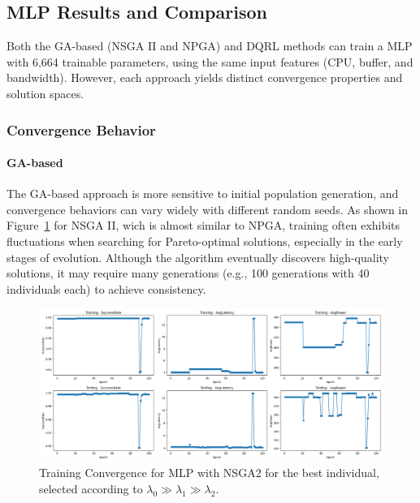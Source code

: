 \documentclass[preprint,12pt]{elsarticle}
\begin{document}
\subsection{MLP Results and Comparison}
\label{subsec:ga_vs_dqrl}

Both the GA-based (NSGA II and NPGA) and DQRL methods can train a MLP with 6,664 trainable parameters, using the same input features (CPU, buffer, and bandwidth). However, each approach yields distinct convergence properties and solution spaces.

\subsubsection{Convergence Behavior}
\paragraph{GA-based}
The GA-based approach is more sensitive to initial population generation, and convergence behaviors can vary widely with different random seeds. As shown in Figure~\ref{fig:nsga2-mlp-training-epoch} for NSGA II, wich is almost similar to NPGA, training often exhibits fluctuations when searching for Pareto-optimal solutions, especially in the early stages of evolution. Although the algorithm eventually discovers high-quality solutions, it may require many generations (e.g., 100 generations with 40 individuals each) to achieve consistency.

\begin{figure}[H]
    \centering
    \includegraphics[width=0.95\linewidth]{figs/nsga2_mlp_training_epoch.png}
    \caption{Training Convergence for MLP with NSGA2 for the best individual, selected according to \(\lambda_0 \gg \lambda_1 \gg \lambda_2\).}
    \label{fig:nsga2-mlp-training-epoch}
\end{figure}
\end{document}
